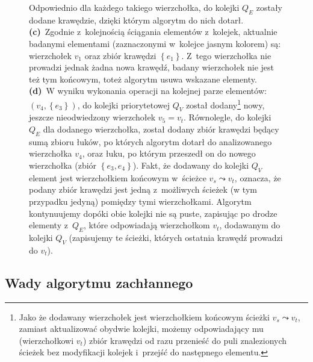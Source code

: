 \begin{savenotes}
\begin{figure}[!h]
{			Odpowiednio dla każdego takiego wierzchołka, do kolejki $Q_{E}$ zostały dodane krawędzie, dzięki którym algorytm do nich dotarł.
			\textbf{(c)}~Zgodnie z~kolejnością ściągania elementów z~kolejek, aktualnie badanymi elementami (zaznaczonymi w~kolejce jasnym kolorem) są: wierzchołek $v_{1}$ oraz zbiór krawędzi $\left\{ e_{1} \right\}$.
			Z~tego wierzchołka nie prowadzi jednak żadna nowa krawędź, badany wierzchołek nie jest też tym końcowym, toteż algorytm usuwa wskazane elementy.
			\textbf{(d)}~W wyniku wykonania operacji na kolejnej parze elementów: $\left( v_{4}, \left\{ e_{3} \right\} \right)$, do kolejki priorytetowej $Q_{V}$ został dodany\footnote{
				Jako że dodawany wierzchołek jest wierzchołkiem końcowym ścieżki $v_{s} \leadsto v_{t}$, zamiast aktualizować obydwie kolejki, możemy odpowiadający mu (wierzchołkowi $v_{t}$) zbiór krawędzi od razu przenieść do puli znalezionych ścieżek bez modyfikacji kolejek i~przejść do następnego elementu.
			} nowy, jeszcze nieodwiedzony wierzchołek $v_{5} = v_{t}$.
			Równolegle, do kolejki $Q_{E}$ dla dodanego wierzchołka, został dodany zbiór krawędzi będący sumą zbioru łuków, po których algorytm dotarł do analizowanego wierzchołka $v_{4}$, oraz łuku, po którym przeszedł on do nowego wierzchołka (zbiór $\left\{ e_{3}, e_{4} \right\}$).
			Fakt, że dodawany do kolejki $Q_{V}$ element jest wierzchołkiem końcowym w~ścieżce $v_{s} \leadsto v_{t}$, oznacza, że podany zbiór krawędzi jest jedną z~możliwych ścieżek (w tym przypadku jedyną) pomiędzy tymi wierzchołkami.
			Algorytm kontynuujemy dopóki obie kolejki nie są puste, zapisując po drodze elementy z~$Q_{E}$, które odpowiadają wierzchołkom $v_{t}$, dodawanym do kolejki $Q_{V}$ (zapisujemy te ścieżki, których ostatnia krawędź prowadzi do $v_{t}$).
		}
		\label{fig:bfsExample}
	\end{figure}
\end{savenotes}



\subsection{Wady algorytmu zachłannego}



